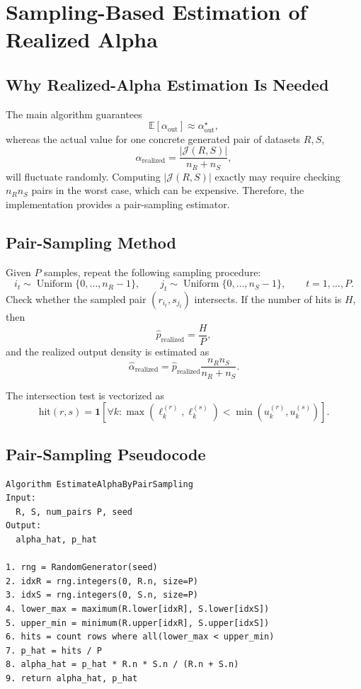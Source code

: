 \documentclass[11pt,a4paper]{article}
\newcommand{\Jset}{\mathcal{J}}
\newcommand{\Exp}{\mathbb{E}}
\newcommand{\Uniform}{\operatorname{Uniform}}
\begin{document}
\section{Sampling-Based Estimation of Realized Alpha}

\subsection{Why Realized-Alpha Estimation Is Needed}

The main algorithm guarantees
\[
  \Exp[\alpha_{\mathrm{out}}]\approx \alpha_{\mathrm{out}}^\star,
\]
whereas the actual value for one concrete generated pair of datasets $R,S$,
\[
  \alpha_{\mathrm{realized}}
  =
  \frac{|\Jset(R,S)|}{n_R+n_S},
\]
will fluctuate randomly. Computing $|\Jset(R,S)|$ exactly may require checking $n_Rn_S$ pairs in the worst case, which can be expensive. Therefore, the implementation provides a pair-sampling estimator.

\subsection{Pair-Sampling Method}

Given $P$ samples, repeat the following sampling procedure:
\[
  i_t\sim\Uniform\{0,\dots,n_R-1\},
  \qquad
  j_t\sim\Uniform\{0,\dots,n_S-1\},
  \qquad t=1,\dots,P.
\]
Check whether the sampled pair $(r_{i_t},s_{j_t})$ intersects. If the number of hits is $H$, then
\[
  \widehat p_{\mathrm{realized}}=\frac{H}{P},
\]
and the realized output density is estimated as
\[
  \widehat\alpha_{\mathrm{realized}}
  =
  \widehat p_{\mathrm{realized}}
  \frac{n_Rn_S}{n_R+n_S}.
\]

The intersection test is vectorized as
\[
  \text{hit}(r,s)
  =
  \mathbf{1}\left[\forall k:
    \max(\ell^{(r)}_k,\ell^{(s)}_k)<
    \min(u^{(r)}_k,u^{(s)}_k)
  \right].
\]

\subsection{Pair-Sampling Pseudocode}

\begin{verbatim}
Algorithm EstimateAlphaByPairSampling
Input:
  R, S, num_pairs P, seed
Output:
  alpha_hat, p_hat

1. rng = RandomGenerator(seed)
2. idxR = rng.integers(0, R.n, size=P)
3. idxS = rng.integers(0, S.n, size=P)
4. lower_max = maximum(R.lower[idxR], S.lower[idxS])
5. upper_min = minimum(R.upper[idxR], S.upper[idxS])
6. hits = count rows where all(lower_max < upper_min)
7. p_hat = hits / P
8. alpha_hat = p_hat * R.n * S.n / (R.n + S.n)
9. return alpha_hat, p_hat
\end{verbatim}
\end{document}
